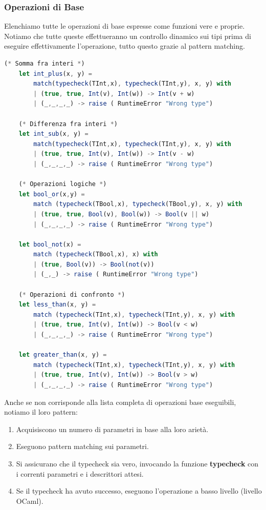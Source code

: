 \documentclass{article}
\begin{document}
\newpage

\subsubsection{Operazioni di Base}

Elenchiamo tutte le operazioni di base espresse come funzioni vere e proprie. Notiamo che tutte queste effettueranno un controllo dinamico sui tipi prima di eseguire effettivamente l'operazione, tutto questo grazie al pattern matching.

    \vspace*{10px}
\begin{lstlisting}[language = JavaScript]
    (* Somma fra interi *)	   
    let int_plus(x, y) = 
        match(typecheck(TInt,x), typecheck(TInt,y), x, y) with
        | (true, true, Int(v), Int(w)) -> Int(v + w)
        | (_,_,_,_) -> raise ( RuntimeError "Wrong type")
    
    (* Differenza fra interi *)
    let int_sub(x, y) = 
        match(typecheck(TInt,x), typecheck(TInt,y), x, y) with
        | (true, true, Int(v), Int(w)) -> Int(v - w)
        | (_,_,_,_) -> raise ( RuntimeError "Wrong type")
    
    (* Operazioni logiche *)
    let bool_or(x,y) = 
        match (typecheck(TBool,x), typecheck(TBool,y), x, y) with
        | (true, true, Bool(v), Bool(w)) -> Bool(v || w)
        | (_,_,_,_) -> raise ( RuntimeError "Wrong type")
    
    let bool_not(x) = 
        match (typecheck(TBool,x), x) with
        | (true, Bool(v)) -> Bool(not(v))
        | (_,_) -> raise ( RuntimeError "Wrong type")
    
    (* Operazioni di confronto *)
    let less_than(x, y) = 
        match (typecheck(TInt,x), typecheck(TInt,y), x, y) with
        | (true, true, Int(v), Int(w)) -> Bool(v < w)
        | (_,_,_,_) -> raise ( RuntimeError "Wrong type")
    
    let greater_than(x, y) = 
        match (typecheck(TInt,x), typecheck(TInt,y), x, y) with
        | (true, true, Int(v), Int(w)) -> Bool(v > w)
        | (_,_,_,_) -> raise ( RuntimeError "Wrong type")

\end{lstlisting}

Anche se non corrisponde alla lista completa di operazioni base eseguibili, notiamo il loro pattern:

\begin{enumerate}
    \item Acquisiscono un numero di parametri in base alla loro arietà.
    \item Eseguono pattern matching sui parametri.
    \item Si assicurano che il typecheck sia vero, invocando la funzione \textbf{typecheck} con i correnti parametri e i descrittori attesi.
    \item Se il typecheck ha avuto successo, eseguono l'operazione a basso livello (livello OCaml).
\end{enumerate}
\end{document}

